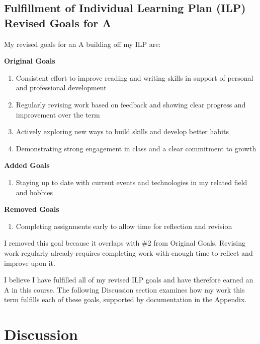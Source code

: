 \documentclass[12pt]{article}
\begin{document}
        \subsection{Fulfillment of Individual Learning Plan (ILP) Revised Goals for A}

        My revised goals for an A building off my ILP are:

        \textbf{Original Goals}
        \begin{enumerate}
            \item Consistent effort to improve reading and writing skills in support of personal and professional development
            \item Regularly revising work based on feedback and showing clear progress and improvement over the term
            \item Actively exploring new ways to build skills and develop better habits
            \item Demonstrating strong engagement in class and a clear commitment to growth
        \end{enumerate}

        \textbf{Added Goals}
        \begin{enumerate}
            \item Staying up to date with current events and technologies in my related field and hobbies
        \end{enumerate}

        \textbf{Removed Goals}
        \begin{enumerate}
            \item Completing assignments early to allow time for reflection and revision
        \end{enumerate}

        I removed this goal because it overlaps with \#2 from Original Goals. Revising work regularly already requires completing work with enough time to reflect and improve upon it.

        I believe I have fulfilled all of my revised ILP goals and have therefore earned an A in this course. The following Discussion section examines how my work this term fulfills each of these goals, supported by documentation in the Appendix.

    \newpage

    \newpage
    \section{Discussion}
\end{document}

